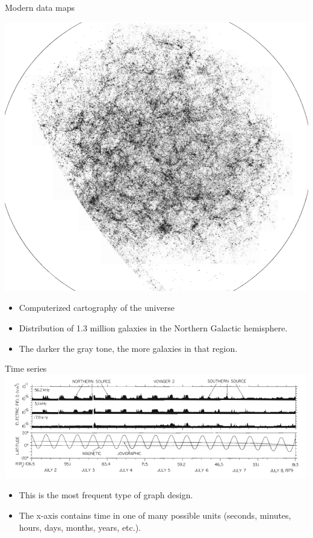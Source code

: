 \documentclass[
  ignorenonframetext,
]{beamer}
\begin{document}
\begin{frame}{Modern data maps}
\protect\hypertarget{modern-data-maps}{}
\begin{minipage}{0.45\textwidth}
\centering
\includegraphics[width=\textwidth]{excellence_figs/fig_12.png}
\end{minipage}
\hfill
\begin{minipage}{0.5\textwidth}
\begin{itemize} \footnotesize
\item Computerized cartography of the universe
\item Distribution of 1.3 million galaxies in the Northern Galactic hemisphere.
\item The darker the gray tone, the more galaxies in that region.
\end{itemize}
\end{minipage}
\end{frame}

\begin{frame}{Time series}
\protect\hypertarget{time-series}{}
\includegraphics{excellence_figs/fig_13.png}

\begin{itemize}
\item
  This is the most frequent type of graph design.
\item
  The x-axis contains time in one of many possible units (seconds,
  minutes, hours, days, months, years, etc.).
\end{itemize}
\end{frame}
\end{document}

